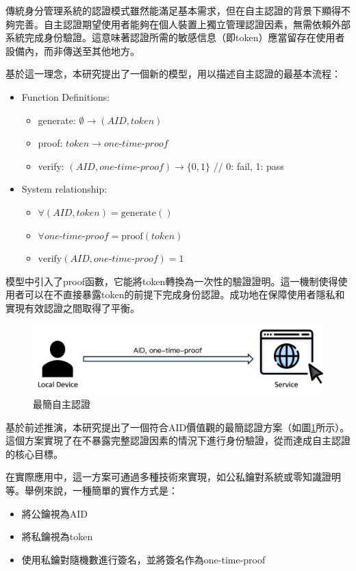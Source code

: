 傳統身分管理系統的認證模式雖然能滿足基本需求，但在自主認證的背景下顯得不夠完善。自主認證期望使用者能夠在個人裝置上獨立管理認證因素，無需依賴外部系統完成身份驗證。這意味著認證所需的敏感信息（即token）應當留存在使用者設備內，而非傳送至其他地方。

基於這一理念，本研究提出了一個新的模型，用以描述自主認證的最基本流程：
\begin{itemize}
  \item Function Definitions:
        \begin{itemize}
          \item generate: $\emptyset \rightarrow (AID, token)$
          \item proof: $token \rightarrow one\text{-}time\text{-}proof$
          \item verify: $(AID, one\text{-}time\text{-}proof) \rightarrow \{0,1\}$ \hfill // 0: fail, 1: pass
        \end{itemize}
  \item System relationship:
        \begin{itemize}
          \item $\forall(AID, token) = \text{generate}()$
          \item $\forall one\text{-}time\text{-}proof = \text{proof}(token)$
          \item $\text{verify}(AID, one\text{-}time\text{-}proof) = 1$
        \end{itemize}
\end{itemize}
模型中引入了proof函數，它能將token轉換為一次性的驗證證明。這一機制使得使用者可以在不直接暴露token的前提下完成身份認證。成功地在保障使用者隱私和實現有效認證之間取得了平衡。

\begin{figure}
  \centering
  \includegraphics[width=\linewidth]{figures/min-aid.png}
  \caption{最簡自主認證}
  \label{fig:min-aid}
\end{figure}
基於前述推演，本研究提出了一個符合AID價值觀的最簡認證方案（如圖\ref{fig:min-aid}所示）。這個方案實現了在不暴露完整認證因素的情況下進行身份驗證，從而達成自主認證的核心目標。

在實際應用中，這一方案可通過多種技術來實現，如公私鑰對系統或零知識證明等。舉例來說，一種簡單的實作方式是：
\begin{itemize}
  \item 將公鑰視為AID
  \item 將私鑰視為token
  \item 使用私鑰對隨機數進行簽名，並將簽名作為one-time-proof
\end{itemize}
